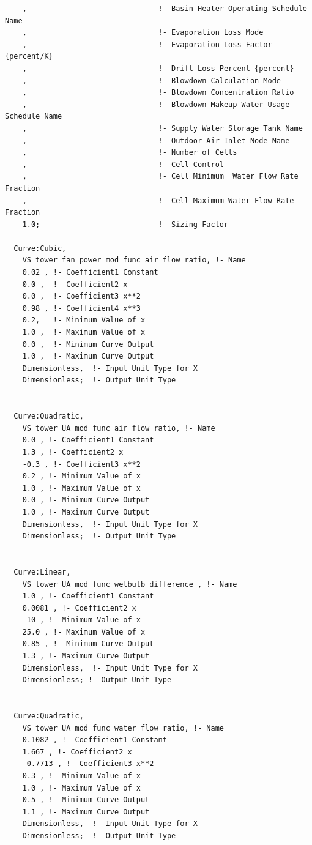 \begin{lstlisting}
    ,                              !- Basin Heater Operating Schedule Name
    ,                              !- Evaporation Loss Mode
    ,                              !- Evaporation Loss Factor {percent/K}
    ,                              !- Drift Loss Percent {percent}
    ,                              !- Blowdown Calculation Mode
    ,                              !- Blowdown Concentration Ratio
    ,                              !- Blowdown Makeup Water Usage Schedule Name
    ,                              !- Supply Water Storage Tank Name
    ,                              !- Outdoor Air Inlet Node Name
    ,                              !- Number of Cells
    ,                              !- Cell Control
    ,                              !- Cell Minimum  Water Flow Rate Fraction
    ,                              !- Cell Maximum Water Flow Rate Fraction
    1.0;                           !- Sizing Factor

  Curve:Cubic,
    VS tower fan power mod func air flow ratio, !- Name
    0.02 , !- Coefficient1 Constant
    0.0 ,  !- Coefficient2 x
    0.0 ,  !- Coefficient3 x**2
    0.98 , !- Coefficient4 x**3
    0.2,   !- Minimum Value of x
    1.0 ,  !- Maximum Value of x
    0.0 ,  !- Minimum Curve Output
    1.0 ,  !- Maximum Curve Output
    Dimensionless,  !- Input Unit Type for X
    Dimensionless;  !- Output Unit Type


  Curve:Quadratic,
    VS tower UA mod func air flow ratio, !- Name
    0.0 , !- Coefficient1 Constant
    1.3 , !- Coefficient2 x
    -0.3 , !- Coefficient3 x**2
    0.2 , !- Minimum Value of x
    1.0 , !- Maximum Value of x
    0.0 , !- Minimum Curve Output
    1.0 , !- Maximum Curve Output
    Dimensionless,  !- Input Unit Type for X
    Dimensionless;  !- Output Unit Type


  Curve:Linear,
    VS tower UA mod func wetbulb difference , !- Name
    1.0 , !- Coefficient1 Constant
    0.0081 , !- Coefficient2 x
    -10 , !- Minimum Value of x
    25.0 , !- Maximum Value of x
    0.85 , !- Minimum Curve Output
    1.3 , !- Maximum Curve Output
    Dimensionless,  !- Input Unit Type for X
    Dimensionless; !- Output Unit Type


  Curve:Quadratic,
    VS tower UA mod func water flow ratio, !- Name
    0.1082 , !- Coefficient1 Constant
    1.667 , !- Coefficient2 x
    -0.7713 , !- Coefficient3 x**2
    0.3 , !- Minimum Value of x
    1.0 , !- Maximum Value of x
    0.5 , !- Minimum Curve Output
    1.1 , !- Maximum Curve Output
    Dimensionless,  !- Input Unit Type for X
    Dimensionless;  !- Output Unit Type

\end{lstlisting}

